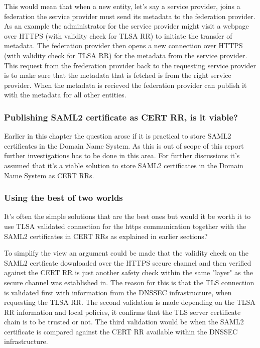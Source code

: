 This would mean that when a new entity, let's say a service provider, joins a federation the service provider must send its metadata to the federation provider.
As an example the administrator for the service provider might visit a webpage over HTTPS (with validity check for TLSA RR) to initiate the transfer of metadata.
The federation provider then opens a new connection over HTTPS (with validity check for TLSA RR) for the metadata from the service provider.
This request from the frederation provider back to the requesting service provider is to make sure that the metadata that is fetched is from the right service provider. 
When the metadata is recieved the federation provider can publish it with the metadata for all other entities.


\subsubsection{Publishing SAML2 certificate as CERT RR, is it viable?}
\label{subsec:saml2-certs-in-cert-rr}
Earlier in this chapter the question arose if it is practical to store SAML2 certificates in the Domain Name System.
As this is out of scope of this report further investigations has to be done in this area.
For further discussions it's assumed that it's a viable solution to store SAML2 certificates in the Domain Name System as CERT RRs.

\subsubsection{Using the best of two worlds}
It's often the simple solutions that are the best ones but would it be worth it to use TLSA validated connection for the https communication together with the SAML2 certificates in CERT RRs as explained in earlier sections?

To simplify the view an argument could be made that the validity check on the SAML2 certficate downloaded over the HTTPS secure channel and then verified against the CERT RR is just another safety check within the same "layer" as the secure channel was established in.
The reason for this is that the TLS connection is validated first with information from the DNSSEC infrastructure, when requesting the TLSA RR.
The second validation is made depending on the TLSA RR information and local policies, it confirms that the TLS server certificate chain is to be trusted or not.
The third validation would be when the SAML2 certificate is compared against the CERT RR available within the DNSSEC infrastructure.

